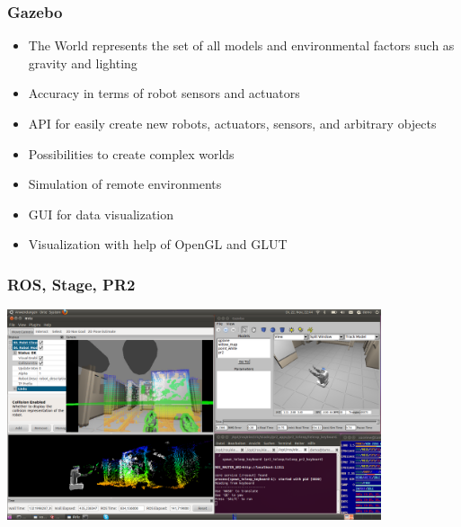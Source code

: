 \begin{frame}
  \frametitle{Gazebo}
\begin{itemize}
    \item The World represents the set of all models and environmental factors such as gravity and lighting
    \item Accuracy in terms of robot sensors and actuators
    \item API for easily create new robots, actuators, sensors, and arbitrary objects
    \item Possibilities to create complex worlds
    \item Simulation of remote environments
    \item GUI for data visualization
    \item Visualization with help of OpenGL and GLUT
    
\end{itemize}
\end{frame}




\begin{frame}
  \frametitle{ROS, Stage, PR2}
\includegraphics[width=11cm]{images/race_pr2_ros_rviz2.png}
\end{frame}
